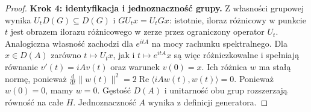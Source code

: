 \documentclass[11pt,a4paper]{article}
\numberwithin{equation}{section}
\theoremstyle{plain}
\theoremstyle{definition}
\theoremstyle{remark}
\begin{document}
\begin{proof}
\textbf{Krok 4: identyfikacja i jednoznaczność grupy.}
Z własności grupowej wynika
$U_tD(G)\subseteq D(G)$ i $GU_tx=U_tGx$:
istotnie, iloraz różnicowy w punkcie $t$ jest obrazem
ilorazu różnicowego w zerze przez ograniczony operator $U_t$.
Analogiczna własność zachodzi dla $e^{itA}$
na mocy rachunku spektralnego.
Dla $x\in D(A)$ zarówno $t\mapsto U_tx$, jak i
$t\mapsto e^{itA}x$ są więc różniczkowalne i spełniają
równanie $v'(t)=iAv(t)$ oraz warunek $v(0)=x$.
Ich różnica $w$ ma stałą normę, ponieważ
$\frac{\mathrm d}{\mathrm dt}\|w(t)\|^2
=2\operatorname{Re}\langle iAw(t),w(t)\rangle=0$.
Ponieważ $w(0)=0$, mamy $w=0$.
Gęstość $D(A)$ i unitarność obu grup rozszerzają równość
na całe $H$. Jednoznaczność $A$ wynika z definicji generatora.
\end{proof}
\endgroup
\end{document}
